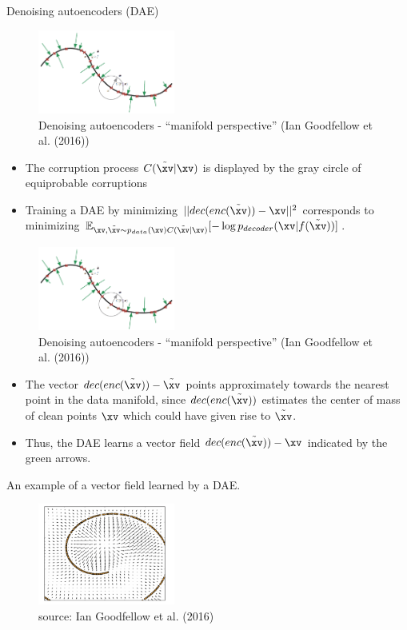 \begin{vbframe}{Denoising autoencoders (DAE)}
\begin{figure}
    \includegraphics[width=4.5cm]{plots/denoising_autoencoder.png}
    \caption{Denoising autoencoders - \enquote{manifold perspective} (Ian Goodfellow et al. (2016))}
  \end{figure}
  \begin{itemize}
    \item The corruption process $C(\tilde{\xv}|\xv)$ is displayed by the gray circle of equiprobable corruptions
    \item Training a DAE  by minimizing  $||dec(enc(\tilde{\xv})) - \xv||^2$ corresponds to minimizing $
    \mathbb{E}_{\xv,\tilde{\xv}\sim p_{data}(\xv)C(\tilde{\xv}|\xv)}[- \log p_{decoder}(\xv|f(\tilde{\xv}))]$.
  \end{itemize}
\framebreak
\begin{figure}
    \centering
    \includegraphics[width=4.5cm]{plots/denoising_autoencoder.png}
    \caption{Denoising autoencoders - \enquote{manifold perspective} (Ian Goodfellow et al. (2016))}
  \end{figure}
  \begin{itemize}
 
    \item The vector $dec(enc(\tilde{\xv})) - \tilde{\xv}$ points approximately towards the nearest point in the  data manifold, since $dec(enc(\tilde{\xv}))$ estimates the center of mass of clean points $\xv$ which could have given rise to $\tilde{\xv}$.
    \item Thus, the DAE learns a vector field $dec(enc(\tilde\xv)) - \xv$ indicated by the green arrows.
  \end{itemize}
  
\framebreak

An example of a vector field learned by a DAE. 
  
  \begin{figure}
    \centering
    \includegraphics[width=4.5cm]{plots/DAE-vectorfield.png}
    \caption{ source: Ian Goodfellow et al. (2016)}
  \end{figure}
  
  
\end{vbframe}
